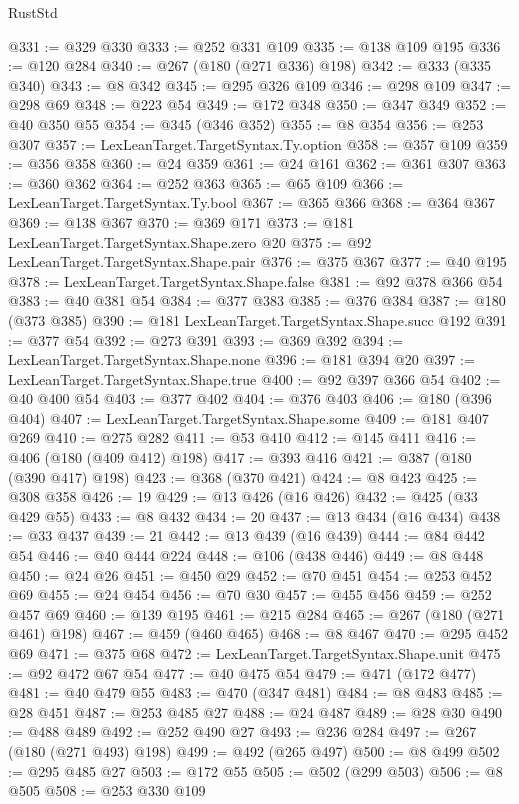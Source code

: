 \begin{lexlean}{RustStd}
\begin{coremodule}
{\begin{coremodule}
{{{{{{{{{{{{{{{{{{{{{{{{{{{{{{{{{{{@331 := @329 @330
@333 := @252 @331 @109
@335 := @138 @109 @195
@336 := @120 @284
@340 := @267 (@180 (@271 @336) @198)
@342 := @333 (@335 @340)
@343 := @8 @342
@345 := @295 @326 @109
@346 := @298 @109
@347 := @298 @69
@348 := @223 @54
@349 := @172 @348
@350 := @347 @349
@352 := @40 @350 @55
@354 := @345 (@346 @352)
@355 := @8 @354
@356 := @253 @307
@357 := LexLeanTarget.TargetSyntax.Ty.option
@358 := @357 @109
@359 := @356 @358
@360 := @24 @359
@361 := @24 @161
@362 := @361 @307
@363 := @360 @362
@364 := @252 @363
@365 := @65 @109
@366 := LexLeanTarget.TargetSyntax.Ty.bool
@367 := @365 @366
@368 := @364 @367
@369 := @138 @367
@370 := @369 @171
@373 := @181 LexLeanTarget.TargetSyntax.Shape.zero @20
@375 := @92 LexLeanTarget.TargetSyntax.Shape.pair
@376 := @375 @367
@377 := @40 @195
@378 := LexLeanTarget.TargetSyntax.Shape.false
@381 := @92 @378 @366 @54
@383 := @40 @381 @54
@384 := @377 @383
@385 := @376 @384
@387 := @180 (@373 @385)
@390 := @181 LexLeanTarget.TargetSyntax.Shape.succ @192
@391 := @377 @54
@392 := @273 @391
@393 := @369 @392
@394 := LexLeanTarget.TargetSyntax.Shape.none
@396 := @181 @394 @20
@397 := LexLeanTarget.TargetSyntax.Shape.true
@400 := @92 @397 @366 @54
@402 := @40 @400 @54
@403 := @377 @402
@404 := @376 @403
@406 := @180 (@396 @404)
@407 := LexLeanTarget.TargetSyntax.Shape.some
@409 := @181 @407 @269
@410 := @275 @282
@411 := @53 @410
@412 := @145 @411
@416 := @406 (@180 (@409 @412) @198)
@417 := @393 @416
@421 := @387 (@180 (@390 @417) @198)
@423 := @368 (@370 @421)
@424 := @8 @423
@425 := @308 @358
@426 := 19
@429 := @13 @426 (@16 @426)
@432 := @425 (@33 @429 @55)
@433 := @8 @432
@434 := 20
@437 := @13 @434 (@16 @434)
@438 := @33 @437
@439 := 21
@442 := @13 @439 (@16 @439)
@444 := @84 @442 @54
@446 := @40 @444 @224
@448 := @106 (@438 @446)
@449 := @8 @448
@450 := @24 @26
@451 := @450 @29
@452 := @70 @451
@454 := @253 @452 @69
@455 := @24 @454
@456 := @70 @30
@457 := @455 @456
@459 := @252 @457 @69
@460 := @139 @195
@461 := @215 @284
@465 := @267 (@180 (@271 @461) @198)
@467 := @459 (@460 @465)
@468 := @8 @467
@470 := @295 @452 @69
@471 := @375 @68
@472 := LexLeanTarget.TargetSyntax.Shape.unit
@475 := @92 @472 @67 @54
@477 := @40 @475 @54
@479 := @471 (@172 @477)
@481 := @40 @479 @55
@483 := @470 (@347 @481)
@484 := @8 @483
@485 := @28 @451
@487 := @253 @485 @27
@488 := @24 @487
@489 := @28 @30
@490 := @488 @489
@492 := @252 @490 @27
@493 := @236 @284
@497 := @267 (@180 (@271 @493) @198)
@499 := @492 (@265 @497)
@500 := @8 @499
@502 := @295 @485 @27
@503 := @172 @55
@505 := @502 (@299 @503)
@506 := @8 @505
@508 := @253 @330 @109
}}}}}}}}}}}}}}}}}}}}}}}}}}}}}}}}}}}
\end{coremodule}}
\end{coremodule}
\end{lexlean}
